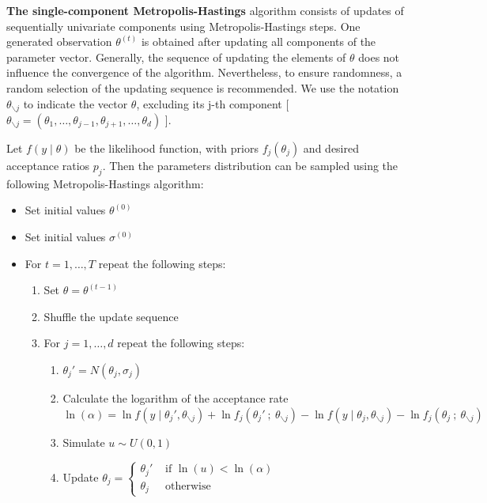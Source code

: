 \documentclass[11pt,fleqn]{book} %
\begin{document}
\textbf{The single-component Metropolis-Hastings} algorithm consists of updates 
of sequentially univariate components using Metropolis-Hastings steps. 
One generated observation $\theta^{(t)}$ is obtained after updating all 
components of the parameter vector. Generally, the sequence of updating the 
elements of $\theta$ does not influence the convergence of the algorithm.
Nevertheless, to ensure randomness, a random selection of the updating 
sequence is recommended. We use the notation $\theta_{\backslash j}$ to 
indicate the vector $\theta$, excluding its j-th component [ $\theta_{\backslash j}
= (\theta_1,\dots,\theta_{j-1},\theta_{j+1},\dots,\theta_{d})$ ].

\begin{algorithm} 
	\label{alg:bimh}
	Let $f(y \mid \theta)$ be the likelihood function, with priors 
	$f_j(\theta_j)$ and desired acceptance ratios $p_j$. Then the 
	parameters distribution can be sampled using the following 
	Metropolis-Hastings algorithm:
	\begin{itemize}
		\item Set initial values $\theta^{(0)}$
		\item Set initial values $\sigma^{(0)}$
		\item For $t=1,\dots,T$ repeat the following steps:
		\begin{enumerate}
			\item Set $\theta=\theta^{(t-1)}$
			\item Shuffle the update sequence
			\item For $j=1,\dots,d$ repeat the following steps:
			\begin{enumerate}[label=\alph*.]
				\item $\theta_j' = N(\theta_j,\sigma_j)$
				\item Calculate the logarithm of the acceptance rate \\
				$\ln(\alpha) = 
					\ln f(y \mid \theta_j',\theta_{\backslash j}) + 
					\ln f_j(\theta_j'\ ;\ \theta_{\backslash j}) - 
					\ln f(y \mid \theta_j,\theta_{\backslash j}) - 
					\ln f_j(\theta_j\ ; \ \theta_{\backslash j})
				$
				\item Simulate $u \sim U(0,1)$
				\item Update $\theta_j=\left\{
				\begin{array}{ll}
					\theta_j' & \text{ if } \ln(u) < \ln(\alpha) \\
					\theta_j  & \text{ otherwise }               
				\end{array}\right.$ 

\end{enumerate}
\end{enumerate}
\end{itemize}
\end{algorithm}
\end{document}
